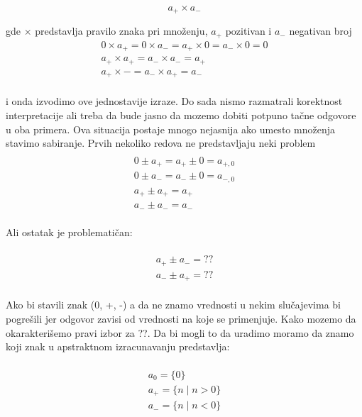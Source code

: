 \begin{equation}
  a_{+} \times a_{-}
\end{equation}

gde $\times$ predstavlja pravilo znaka pri množenju, $a_{+}$ pozitivan i $a_{-}$ negativan broj \\

\begin{multline}
  	0 \times a_{+} = 0 \times a_{-} = a_{+} \times 0 = a_{-} \times 0 = 0 \\
  	a_{+} \times a_{+} = a_{-} \times a_{-} = a_{+} \\
  	a_{+} \times - = a_{-} \times a_{+} = a_{-} \\
\end{multline}

i onda izvodimo ove jednostavije izraze. Do sada nismo razmatrali korektnost interpretacije ali treba da bude jasno da mozemo dobiti potpuno tačne odgovore u oba primera. Ova situacija postaje mnogo nejasnija ako umesto množenja stavimo sabiranje. Prvih nekoliko redova ne pred\-stavljaju neki problem \\

\begin{multline} \\
	0 \pm a_{+} = a_{+} \pm 0 = a_{+,0} \\ 
	0 \pm a_{-} = a_{-} \pm 0 = a_{-,0} \\ 
	a_{+} \pm a_{+} = a_{+}  \\ 
	a_{-} \pm a_{-} = a_{-}  \\ 
\end{multline}


Ali ostatak je problematičan:

\begin{multline}	\\
	a_{+} \pm a_{-} = ?? \\ 
	a_{-} \pm a_{+} = ?? \\ 
\end{multline}

Ako bi stavili znak (0, +, -) a da ne znamo vrednosti u nekim slu\-čajevima bi pogrešili jer odgovor zavisi od vrednosti na koje se primenjuje. Kako mozemo da okarakterišemo pravi izbor za ??. Da bi mogli to da uradimo moramo da znamo koji znak u apstraktnom izracunavanju predstavlja:

\begin{multline}	\\
	a_{0} = \{0\}				\\    
	a_{+} = \{n \mid n > 0\}		\\	
	a_{-} = \{n \mid n < 0\}		\\
\end{multline}

